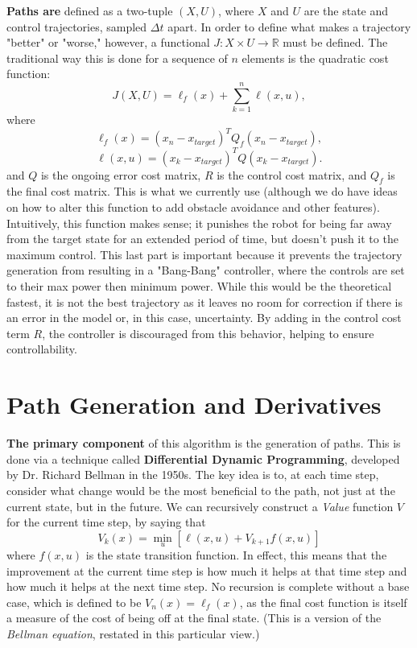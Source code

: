 \documentclass[a4paper,12pt]{article}
\begin{document}
\textbf{Paths are} defined as a two-tuple $(X, U)$, where $X$ and $U$ are the state and control trajectories, sampled $\Delta t$ apart. In order to define what makes a trajectory "better" or "worse," however, a functional $J: X \times U \rightarrow \mathbb{R}$ must be defined. The traditional way this is done for a sequence of $n$ elements is the quadratic cost function: 
$$J(X, U) = \ell_f(x) +\sum_{k=1}^{n} \ell(x, u),$$ where
$$
\ell_f(x) = (x_n - x_{target})^TQ_f(x_n - x_{target}),$$$$
\ell(x, u) = (x_k - x_{target})^TQ(x_k - x_{target}).
$$
and $Q$ is the ongoing error cost matrix, $R$ is the control cost matrix, and $Q_f$ is the final cost matrix. This is what we currently use (although we do have ideas on how to alter this function to add obstacle avoidance and other features). Intuitively, this function makes sense; it punishes the robot for being far away from the target state for an extended period of time, but doesn't push it to the maximum control. This last part is important because it prevents the trajectory generation from resulting in a "Bang-Bang" controller, where the controls are set to their max power then minimum power. While this would be the theoretical fastest, it is not the best trajectory as it leaves no room for correction if there is an error in the model or, in this case, uncertainty. By adding in the control cost term $R$, the controller is discouraged from this behavior, helping to ensure controllability.

\section{Path Generation and Derivatives}
\textbf{The primary component} of this algorithm is the generation of paths. This is done via a technique called \textbf{Differential Dynamic Programming}, developed by Dr. Richard Bellman in the 1950s. The key idea is to, at each time step, consider what change would be the most beneficial to the path, not just at the current state, but in the future. We can recursively construct a \textit{Value} function $V$ for the current time step, by saying that $$V_k(x) = \min_u [\ell(x, u) + V_{k+1}{f(x, u)}]$$
where $f(x, u)$ is the state transition function. In effect, this means that the improvement at the current time step is how much it helps at that time step and how much it helps at the next time step. No recursion is complete without a base case, which is defined to be $V_n(x) = \ell_f(x)$, as the final cost function is itself a measure of the cost of being off at the final state. (This is a version of the \textit{Bellman equation}, restated in this particular view.)\\
\end{document}
